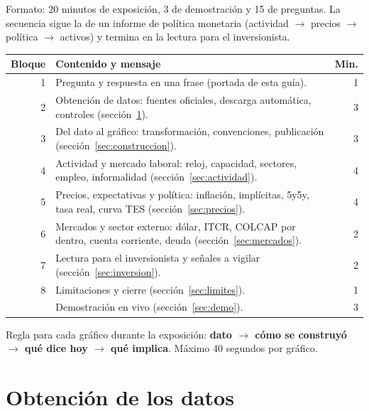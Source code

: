 \documentclass[11pt]{article}
\begin{document}
Formato: 20 minutos de exposición, 3 de demostración y 15 de preguntas. La secuencia sigue la de un
informe de política monetaria (actividad $\rightarrow$ precios $\rightarrow$ política $\rightarrow$ activos) y
termina en la lectura para el inversionista.

\begin{center}\small
\begin{tabularx}{\linewidth}{@{}rXr@{}}
\toprule
\textbf{Bloque} & \textbf{Contenido y mensaje} & \textbf{Min.}\\\midrule
1 & Pregunta y respuesta en una frase (portada de esta guía). & 1\\
2 & Obtención de datos: fuentes oficiales, descarga automática, controles (sección~\ref{sec:datos}). & 3\\
3 & Del dato al gráfico: transformación, convenciones, publicación (sección~\ref{sec:construccion}). & 3\\
4 & Actividad y mercado laboral: reloj, capacidad, sectores, empleo, informalidad (sección~\ref{sec:actividad}). & 4\\
5 & Precios, expectativas y política: inflación, implícitas, 5y5y, tasa real, curva TES (sección~\ref{sec:precios}). & 4\\
6 & Mercados y sector externo: dólar, ITCR, COLCAP por dentro, cuenta corriente, deuda (sección~\ref{sec:mercados}). & 2\\
7 & Lectura para el inversionista y señales a vigilar (sección~\ref{sec:inversion}). & 2\\
8 & Limitaciones y cierre (sección~\ref{sec:limites}). & 1\\
\midrule
 & Demostración en vivo (sección~\ref{sec:demo}). & 3\\
\bottomrule
\end{tabularx}
\end{center}

Regla para cada gráfico durante la exposición: \textbf{dato $\rightarrow$ cómo se construyó $\rightarrow$
qué dice hoy $\rightarrow$ qué implica}. Máximo 40 segundos por gráfico.

\section{Obtención de los datos}
\label{sec:datos}

\end{document}
